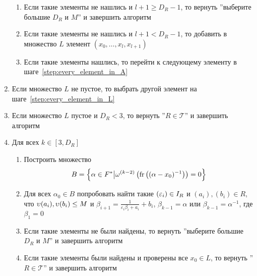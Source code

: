 \documentclass[_00_autoref.tex]{subfiles}
\begin{document}
\begin{enumerate}
\begin{enumerate}
            \item Если такие элементы не нашлись и $l+1 \ge D_R - 1$, то вернуть ''выберите большие $D_R$ и $M$'' и завершить алгоритм
            
            \item Если такие элементы не нашлись и $l+1 < D_R - 1$, то добавить в множество $L$ элемент $(x_0,\ldots,x_l,x_{l+1})$
            
            \item Если такие элементы нашлись, то перейти к следующему элементу в шаге~\ref{step:every_element_in_A}
        \end{enumerate}

        \item Если множество $L$ не пустое, то выбрать другой элемент на шаге~\ref{step:every_element_in_L}
        
        \item Если множество $L$ пустое и $D_R < 3$, то вернуть ''$R \in \mathcal{T}$'' и завершить алгоритм
        
        \item Для всех $k \in [3, D_R]$
        \begin{enumerate}
            \item Построить множество
            \begin{equation*}
                B = \left\{
                    \alpha \in F^{*} \big| \omega^{(k-2)}\left(
                        \textrm{fr}\left((\alpha-x_0)^{-1}\right)
                    \right) = 0
                \right\}
            \end{equation*}

            \item Для всех $\alpha_0 \in B$ попробовать найти такие $(\varepsilon_i) \in I_{R}$ и $(a_i), (b_i) \in R$, что $\upsilon(a_i), \upsilon(b_i) \le M$ и $\beta_{i + 1} = \frac{1}{\varepsilon_i \beta_i + a_i} + b_i$, $\beta_{k - 1} = \alpha \textrm{ или } \beta_{k-1} = \alpha^{-1}$, где $\beta_1 = 0$

            \item Если такие элементы не были найдены, то вернуть ''выберите большие $D_R$ и $M$'' и завершить алгоритм
            
            \item Если такие элементы были найдены и проверены все $x_0 \in L$, то вернуть ''$R \in \mathcal{T}$'' и завершить алгоритм
        \end{enumerate}
    \end{enumerate}
\end{document}
